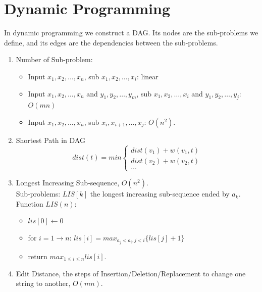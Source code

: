 \documentclass[10pt, a4paper, twocolumn]{article}
\begin{document}
\section{Dynamic Programming}
In dynamic programming we construct a DAG. Its nodes are the sub-problems we define, and its edges are the dependencies between the sub-problems.
\begin{enumerate}[leftmargin = 12pt, topsep = 0pt, itemsep=0pt, partopsep = 0pt]
    \item Number of Sub-problem:
        \begin{itemize}[leftmargin = 12pt, topsep = 0pt, itemsep=0pt, partopsep = 0pt]
        \item Input $x_1,x_2,\dots,x_n$, sub $x_1,x_2,\dots,x_i$: linear
        \item Input $x_1,x_2,\dots,x_n$ and $y_1,y_2,\dots,y_m$, sub $x_1,x_2,\dots,x_i$ and $y_1,y_2,\dots,y_j$: $O(mn)$
        \item Input $x_1,x_2,\dots,x_n$, sub $x_i,x_{i+1},\dots,x_j$: $O(n^2)$.
        \end{itemize}
    \item Shortest Path in DAG\\
        \begin{equation}
        	dist(t) = min \begin{cases}
        	dist(v_1)+w(v_1,t)\\
        	dist(v_2)+w(v_2,t)\\
        	\dots
        	\end{cases}
        \nonumber 
        \end{equation}
    \item Longest Increasing Sub-sequence, $O(n^2)$.\\
        Sub-problems: $LIS[k]$ the longest increasing sub-sequence ended by $a_k$.\\
        Function $LIS(n)$:
        \begin{itemize}[leftmargin = 12pt, topsep = 0pt, itemsep=0pt, partopsep = 0pt]
        \item $lis[0]\leftarrow 0$
        \item for $i=1\to n$: $lis[i]=max_{a_j<a_i,j<i}\{lis[j]+1\}$
        \item return $max_{1\leq i\leq n}lis[i]$.
        \end{itemize}
    \item Edit Distance, the steps of Insertion/Deletion/Replacement     to change one string to another, $O(mn)$.\\

\end{enumerate}
\end{document}
